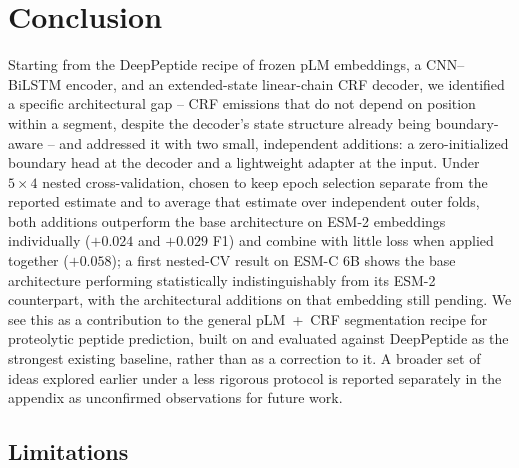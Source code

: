 \documentclass{article}
\begin{document}
\section{Conclusion}
\label{sec:conclusion}

Starting from the DeepPeptide recipe of frozen pLM embeddings, a CNN--BiLSTM encoder, and an extended-state linear-chain CRF decoder, we identified a specific architectural gap -- CRF emissions that do not depend on position within a segment, despite the decoder's state structure already being boundary-aware -- and addressed it with two small, independent additions: a zero-initialized boundary head at the decoder and a lightweight adapter at the input. Under $5\times4$ nested cross-validation, chosen to keep epoch selection separate from the reported estimate and to average that estimate over independent outer folds, both additions outperform the base architecture on ESM-2 embeddings individually ($+0.024$ and $+0.029$ F1) and combine with little loss when applied together ($+0.058$); a first nested-CV result on ESM-C 6B shows the base architecture performing statistically indistinguishably from its ESM-2 counterpart, with the architectural additions on that embedding still pending. We see this as a contribution to the general pLM~+~CRF segmentation recipe for proteolytic peptide prediction, built on and evaluated against DeepPeptide as the strongest existing baseline, rather than as a correction to it. A broader set of ideas explored earlier under a less rigorous protocol is reported separately in the appendix as unconfirmed observations for future work.

\subsection{Limitations}
\label{sec:limitations}
\end{document}
